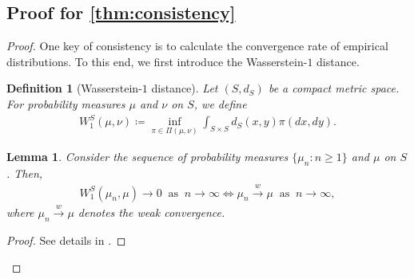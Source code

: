 \documentclass{article}
\newtheorem{lemma}{Lemma}
\newtheorem{definition}{Definition}
\begin{document}
\subsection{Proof for \cref{thm:consistency}}\label{pf:thm:consistency}
\begin{proof}
	One key of consistency is to calculate the convergence rate of empirical distributions. To this end, we first introduce the Wasserstein-$1$ distance.
	\begin{definition}[Wasserstein-$1$ distance]
		\label{def:Wasserstein-1}
		Let $(S,d_S)$ be a compact metric space. For probability measures $\mu$ and $\nu$ on $S$, we define
		\begin{align*}
			W_1^S(\mu,\nu) \coloneqq \inf_{\pi \in \Pi(\mu,\nu)} \int_{S \times S} d_S(x,y) \pi(dx,dy) . 
		\end{align*}
	\end{definition}
	
	\begin{lemma}
		\label{lem:equivalence-to-weak-convergence}
		Consider the sequence of probability measures $\{\mu_n: n \geq 1\}$ and $\mu$ on $S$. Then,
		\begin{align*}
			W_1^S(\mu_n,\mu) \to 0 \;\; \text{as} \;\; n \to \infty \iff \mu_n \overset{w}{\to} \mu \;\; \text{as} \;\; n \to \infty ,
		\end{align*}
		where $\mu_n \overset{w}{\to} \mu$ denotes the weak convergence.
	\end{lemma}
	\begin{proof}
		See details in \cite{villani2008optimal}.
	\end{proof}
	

\end{proof}
\end{document}
